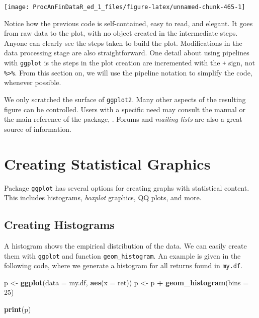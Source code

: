 \documentclass[11pt,]{book}
\newenvironment{Shaded}{\begin{snugshade}}{\end{snugshade}}
\newcommand{\KeywordTok}[1]{\textcolor[rgb]{0.27,0.27,0.27}{\textbf{#1}}}
\newcommand{\DataTypeTok}[1]{\textcolor[rgb]{0.27,0.27,0.27}{#1}}
\newcommand{\DecValTok}[1]{\textcolor[rgb]{0.06,0.06,0.06}{#1}}
\newcommand{\StringTok}[1]{\textcolor[rgb]{0.5,0.5,0.5}{#1}}
\newcommand{\OperatorTok}[1]{\textcolor[rgb]{0.81,0.36,0.00}{\textbf{#1}}}
\newcommand{\NormalTok}[1]{#1}
\begin{document}
\begin{center}\texttt{[image: ProcAnFinDataR\_ed\_1\_files/figure-latex/unnamed-chunk-465-1]} \end{center}

Notice how the previous code is self-contained, easy to read, and
elegant. It goes from raw data to the plot, with no object created in
the intermediate steps. Anyone can clearly see the steps taken to build
the plot. Modifications in the data processing stage are also
straightforward. One detail about using pipelines with \texttt{ggplot}
is the steps in the plot creation are incremented with the \texttt{+}
sign, not \texttt{\%\textgreater{}\%}. From this section on, we will use
the pipeline notation to simplify the code, whenever possible.

We only scratched the surface of \texttt{ggplot2}. Many other aspects of
the resulting figure can be controlled. Users with a specific need may
consult the manual or the main reference of the package,
\citet{wickham2009ggplot2}. Forums and \emph{mailing lists} are also a
great source of information.

\section{Creating Statistical
Graphics}\label{creating-statistical-graphics}

Package \texttt{ggplot} has several options for creating graphs with
statistical content. This includes histograms, \emph{boxplot} graphics,
QQ plots, and more.

\subsection{Creating Histograms}\label{creating-histograms}

A histogram shows the empirical distribution of the data. We can easily
create them with \texttt{ggplot} and function \texttt{geom\_histogram}.
An example is given in the following code, where we generate a histogram
for all returns found in \texttt{my.df}.

\begin{Shaded}
\begin{Highlighting}[]
\NormalTok{p <-}\StringTok{ }\KeywordTok{ggplot}\NormalTok{(}\DataTypeTok{data =}\NormalTok{ my.df, }\KeywordTok{aes}\NormalTok{(}\DataTypeTok{x =}\NormalTok{ ret))}
\NormalTok{p <-}\StringTok{ }\NormalTok{p }\OperatorTok{+}\StringTok{ }\KeywordTok{geom_histogram}\NormalTok{(}\DataTypeTok{bins =} \DecValTok{25}\NormalTok{)}
  
\KeywordTok{print}\NormalTok{(p)}
\end{Highlighting}
\end{Shaded}
\end{document}
